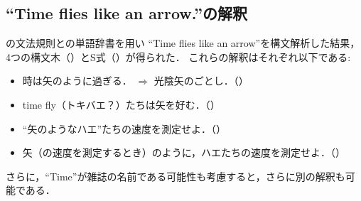 \documentclass[uplatex, dvipdfmx, a4paper, twocolumn]{jsarticle}
\begin{document}
    \subsection{``Time flies like an arrow.''の解釈}
    の文法規則との単語辞書を用い
    ``Time flies like an arrow''を構文解析した結果，4つの構文木（）とS式（）が得られた．
    これらの解釈はそれぞれ以下である:
    \begin{itemize}
      \item 時は矢のように過ぎる． $\Rightarrow$ 光陰矢のごとし．（）
      \item time fly（トキバエ？）たちは矢を好む．（）
      \item ``矢のようなハエ''たちの速度を測定せよ．（）
      \item 矢（の速度を測定するとき）のように，ハエたちの速度を測定せよ．（）
    \end{itemize}
    さらに，``Time''が雑誌の名前である可能性も考慮すると，さらに別の解釈も可能である．
\end{document}
